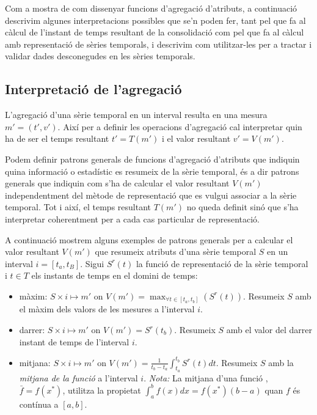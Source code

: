 Com a mostra de com dissenyar funcions d'agregació d'atributs, a
continuació descrivim algunes interpretacions possibles que se'n poden
fer, tant pel que fa al càlcul de l'instant de temps resultant de la
consolidació com pel que fa al càlcul amb representació de sèries
temporals, i descrivim com utilitzar-les per a tractar i validar dades
desconegudes en les sèries temporals.



\subsection{Interpretació de l'agregació}


L'agregació d'una sèrie temporal en un interval resulta en una mesura
$m'=(t',v')$. Així per a definir les operacions d'agregació cal
interpretar quin ha de ser el temps resultant $t'=T(m')$ i el valor
resultant $v'=V(m')$.


Podem definir patrons generals de funcions d'agregació d'atributs que
indiquin quina informació o estadístic es resumeix de la sèrie
temporal, és a dir patrons generals que indiquin com s'ha de calcular
el valor resultant $V(m')$ independentment del mètode de representació
que es vulgui associar a la sèrie temporal.  Tot i així, el temps
resultant $T(m')$ no queda definit sinó que s'ha interpretar
coherentment per a cada cas particular de representació.


A continuació mostrem alguns exemples de patrons generals per a
calcular el valor resultant $V(m')$ que resumeix atributs d'una sèrie
temporal $S$ en un interval $i=[t_a,t_B]$. Sigui $S^r(t)$ la funció de
representació de la sèrie temporal i $t\in T$ els instants de temps
en el domini de temps:
\begin{itemize}
\item màxim: $S \times i \mapsto m'$ on $V(m') = \max_{\forall t \in
    [t_a,t_b]}(S^r(t))$. Resumeix $S$ amb el màxim dels valors de les
  mesures a l'interval $i$.
\item darrer: $S \times i \mapsto m'$ on $V(m') = S^r(t_b)$. Resumeix
  $S$ amb el valor del darrer instant de temps de l'interval $i$.

\item mitjana: $S \times i \mapsto m'$ on $V(m') = \frac{1}{t_b-t_a}
  \int_{t_a}^{t_b} S^r(t)dt$. Resumeix $S$ amb la \emph{mitjana de la
    funció} a l'interval $i$. \emph{Nota:} La mitjana d'una
  funció \parencite{weisstein:averagefunction}, $\bar f=f(x^*)$,
  utilitza la propietat $\int_a^b f(x)dx = f(x^*)(b-a)$ quan $f$ és
  contínua a $[a,b]$.

\end{itemize}




